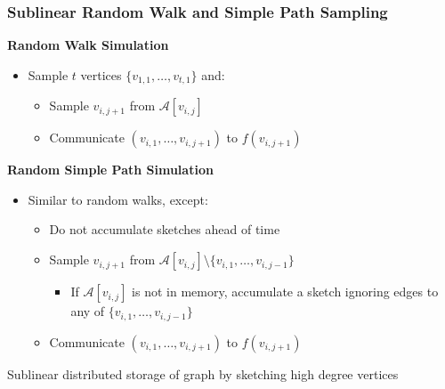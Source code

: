 \documentclass{beamer}
\begin{document}
\begin{frame}
\frametitle{Sublinear Random Walk and Simple Path Sampling}

\textbf{Random Walk Simulation}
\begin{itemize}
	\item Sample $t$ vertices $\{v_{1,1}, \dots, v_{t,1}\}$ and: 
	\begin{itemize}
		\item Sample $v_{i, j + 1}$ from $\mathcal{A}[v_{i, j}]$
		\item Communicate $(v_{i, 1}, \dots, v_{i, j + 1})$ to $f(v_{i, j + 1})$
	\end{itemize}
\end{itemize}
\textbf{Random Simple Path Simulation}
\begin{itemize}
	\item Similar to random walks, except:
	\begin{itemize}
		\item Do not accumulate sketches ahead of time
		\item Sample $v_{i, j + 1}$ from $\mathcal{A}[v_{i, j}] \setminus \{v_{i, 1}, \dots, v_{i, j - 1}\}$ 
		\begin{itemize}
			\item If $\mathcal{A}[v_{i, j}]$ is not in memory, accumulate a sketch ignoring edges to any of $\{v_{i, 1}, \dots, v_{i, j - 1}\}$
		\end{itemize}
		\item Communicate $(v_{i, 1}, \dots, v_{i, j + 1})$ to $f(v_{i, j + 1})$
	\end{itemize}
\end{itemize}

\begin{block}{}
\begin{center}
Sublinear distributed storage of graph by sketching high degree vertices
\end{center}
\end{block}


\end{frame}

\end{document}
